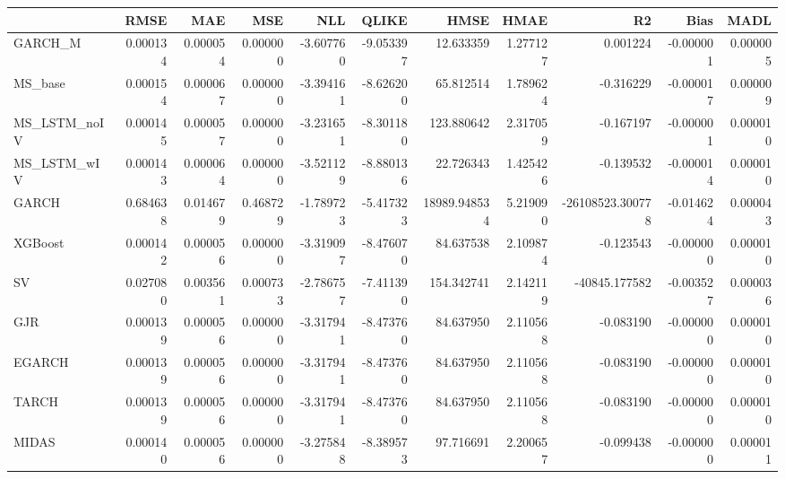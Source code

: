 \begin{tabular}{lrrrrrrrrrr}
\toprule
 & RMSE & MAE & MSE & NLL & QLIKE & HMSE & HMAE & R2 & Bias & MADL \\
\midrule
GARCH_M & 0.000134 & 0.000054 & 0.000000 & -3.607760 & -9.053397 & 12.633359 & 1.277127 & 0.001224 & -0.000001 & 0.000005 \\
MS_base & 0.000154 & 0.000067 & 0.000000 & -3.394161 & -8.626200 & 65.812514 & 1.789624 & -0.316229 & -0.000017 & 0.000009 \\
MS_LSTM_noIV & 0.000145 & 0.000057 & 0.000000 & -3.231651 & -8.301180 & 123.880642 & 2.317059 & -0.167197 & -0.000001 & 0.000010 \\
MS_LSTM_wIV & 0.000143 & 0.000064 & 0.000000 & -3.521129 & -8.880136 & 22.726343 & 1.425426 & -0.139532 & -0.000014 & 0.000010 \\
GARCH & 0.684638 & 0.014679 & 0.468729 & -1.789723 & -5.417323 & 18989.948534 & 5.219090 & -26108523.300778 & -0.014624 & 0.000043 \\
XGBoost & 0.000142 & 0.000056 & 0.000000 & -3.319097 & -8.476070 & 84.637538 & 2.109874 & -0.123543 & -0.000000 & 0.000010 \\
SV & 0.027080 & 0.003561 & 0.000733 & -2.786757 & -7.411390 & 154.342741 & 2.142119 & -40845.177582 & -0.003527 & 0.000036 \\
GJR & 0.000139 & 0.000056 & 0.000000 & -3.317941 & -8.473760 & 84.637950 & 2.110568 & -0.083190 & -0.000000 & 0.000010 \\
EGARCH & 0.000139 & 0.000056 & 0.000000 & -3.317941 & -8.473760 & 84.637950 & 2.110568 & -0.083190 & -0.000000 & 0.000010 \\
TARCH & 0.000139 & 0.000056 & 0.000000 & -3.317941 & -8.473760 & 84.637950 & 2.110568 & -0.083190 & -0.000000 & 0.000010 \\
MIDAS & 0.000140 & 0.000056 & 0.000000 & -3.275848 & -8.389573 & 97.716691 & 2.200657 & -0.099438 & -0.000000 & 0.000011 \\
\bottomrule
\end{tabular}
